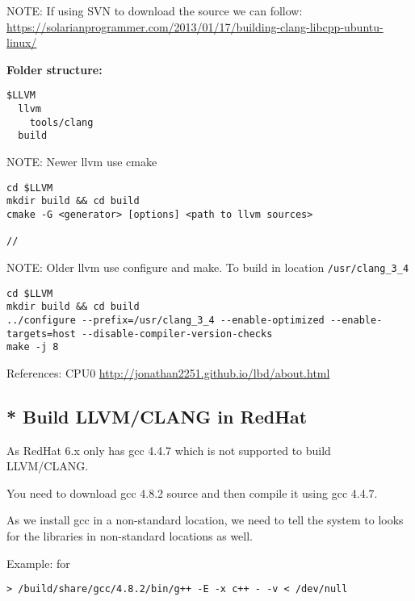 NOTE: If using SVN to download the source we can follow:
\url{https://solarianprogrammer.com/2013/01/17/building-clang-libcpp-ubuntu-linux/}

{\bf Folder structure:}
\begin{verbatim}
$LLVM
  llvm
    tools/clang
  build
\end{verbatim}

NOTE: Newer llvm use cmake
\begin{verbatim}
cd $LLVM
mkdir build && cd build
cmake -G <generator> [options] <path to llvm sources>

// 
\end{verbatim}



NOTE: Older llvm use configure and make. To build in location
\verb!/usr/clang_3_4!
\begin{verbatim}
cd $LLVM
mkdir build && cd build
../configure --prefix=/usr/clang_3_4 --enable-optimized --enable-targets=host --disable-compiler-version-checks
make -j 8
\end{verbatim}

References: CPU0
\url{http://jonathan2251.github.io/lbd/about.html}

\subsection{* Build LLVM/CLANG in RedHat}
\label{sec:LLVM-build}
\label{sec:CLANG-build}

As RedHat 6.x only has gcc 4.4.7 which is not supported to build LLVM/CLANG.

You need to download gcc 4.8.2 source and then compile it using gcc 4.4.7.

As we install gcc in a non-standard location, we need to tell the system to
looks for the libraries in non-standard locations as well.

Example: for 
\begin{verbatim}
> /build/share/gcc/4.8.2/bin/g++ -E -x c++ - -v < /dev/null
\end{verbatim}


